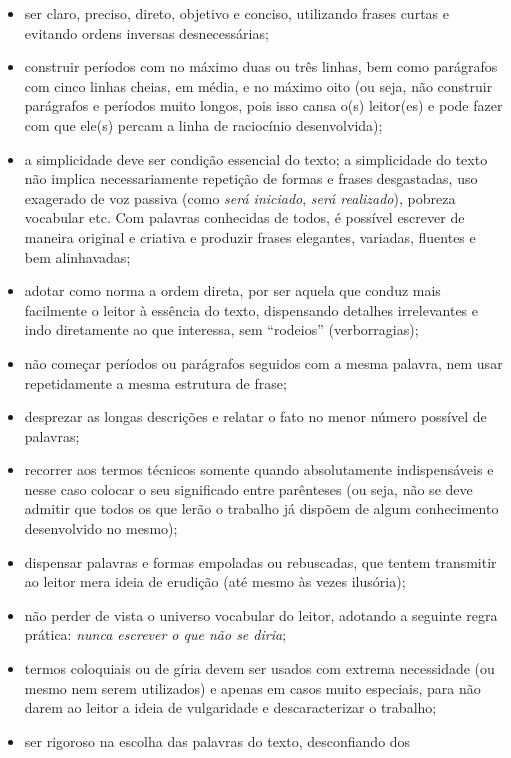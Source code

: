 \begin{itemize}
   \item ser claro, preciso, direto, objetivo e conciso, utilizando frases
   curtas e evitando ordens inversas desnecessárias;
   \item construir períodos com no máximo duas ou três linhas, bem como
   parágrafos com cinco linhas cheias, em média, e no máximo oito (ou seja, não
   construir parágrafos e períodos muito longos, pois isso cansa o(s) leitor(es)
   e pode fazer com que ele(s) percam a linha de raciocínio desenvolvida);
   \item a simplicidade deve ser condição essencial do texto; a simplicidade do
   texto não implica necessariamente repetição de formas e frases desgastadas,
   uso exagerado de voz passiva (como \textit{será iniciado}, \textit{será
   realizado}), pobreza vocabular etc. Com palavras conhecidas de todos, é
   possível escrever de maneira original e criativa e produzir frases elegantes,
   variadas, fluentes e bem alinhavadas;
   \item adotar como norma a ordem direta, por ser aquela que conduz mais
   facilmente o leitor à essência do texto, dispensando detalhes irrelevantes e
   indo diretamente ao que interessa, sem ``rodeios'' (verborragias);
   \item não começar períodos ou parágrafos seguidos com a mesma palavra, nem
   usar repetidamente a mesma estrutura de frase;
   \item desprezar as longas descrições e relatar o fato no menor número
   possível de palavras;
   \item recorrer aos termos técnicos somente quando absolutamente
   indispensáveis e nesse caso colocar o seu significado entre parênteses (ou
   seja, não se deve admitir que todos os que lerão o trabalho já dispõem de
   algum conhecimento desenvolvido no mesmo);
   \item dispensar palavras e formas empoladas ou rebuscadas, que tentem
   transmitir ao leitor mera ideia de erudição (até mesmo às vezes ilusória);
   \item não perder de vista o universo vocabular do leitor, adotando a seguinte
   regra prática: \textit{nunca escrever o que não se diria};
   \item termos coloquiais ou de gíria devem ser usados com extrema necessidade
   (ou mesmo nem serem utilizados) e apenas em casos muito especiais, para não
   darem ao leitor a ideia de vulgaridade e descaracterizar o trabalho;
   \item ser rigoroso na escolha das palavras do texto, desconfiando dos

\end{itemize}
